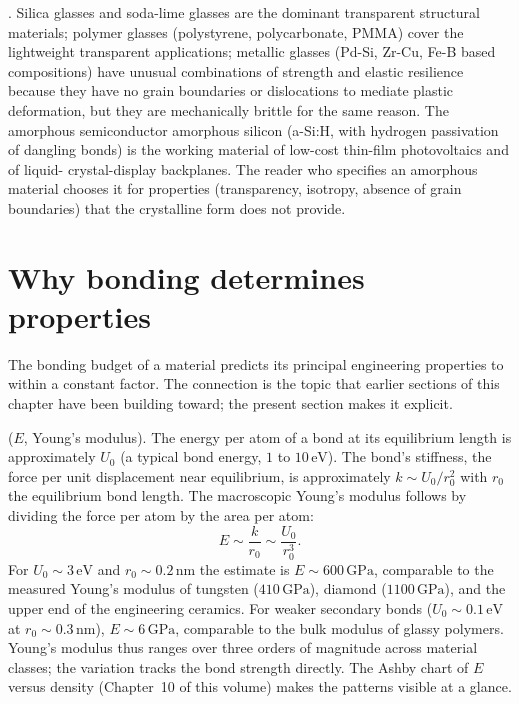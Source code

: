 . Silica glasses and
soda-lime glasses are the dominant transparent structural materials;
polymer glasses (polystyrene, polycarbonate, PMMA) cover the
lightweight transparent applications; metallic glasses (Pd-Si, Zr-Cu,
Fe-B based compositions) have unusual combinations of strength and
elastic resilience because they have no grain boundaries or
dislocations to mediate plastic deformation, but they are mechanically
brittle for the same reason. The amorphous semiconductor amorphous
silicon (a-Si:H, with hydrogen passivation of dangling bonds) is the
working material of low-cost thin-film photovoltaics and of liquid-
crystal-display backplanes. The reader who specifies an amorphous
material chooses it for properties (transparency, isotropy, absence
of grain boundaries) that the crystalline form does not provide.

\section{Why bonding determines properties}

The bonding budget of a material predicts its principal engineering
properties to within a constant factor. The connection is the topic
that earlier sections of this chapter have been building toward; the
present section makes it explicit.

 ($E$, Young's modulus). The energy per
atom of a bond at its equilibrium length is approximately $U_0$ (a
typical bond energy, $1$ to $10\,\text{eV}$). The bond's stiffness,
the force per unit displacement near equilibrium, is approximately
$k \sim U_0/r_0^2$ with $r_0$ the equilibrium bond length. The
macroscopic Young's modulus follows by dividing the force per atom by
the area per atom:
\[
E \sim \frac{k}{r_0} \sim \frac{U_0}{r_0^3}.
\]
For $U_0 \sim 3\,\text{eV}$ and $r_0 \sim 0.2\,\text{nm}$ the estimate
is $E \sim 600\,\text{GPa}$, comparable to the measured Young's
modulus of tungsten ($410\,\text{GPa}$), diamond ($1100\,\text{GPa}$),
and the upper end of the engineering ceramics. For weaker secondary
bonds ($U_0 \sim 0.1\,\text{eV}$ at $r_0 \sim 0.3\,\text{nm}$),
$E \sim 6\,\text{GPa}$, comparable to the bulk modulus of glassy
polymers. Young's modulus thus ranges over three orders of magnitude
across material classes; the variation tracks the bond strength
directly. The Ashby chart of $E$ versus density (Chapter~10 of this
volume) makes the patterns visible at a glance.

